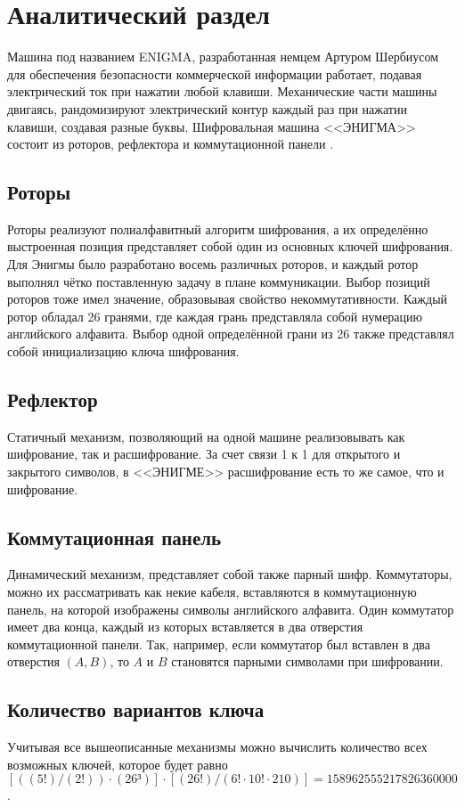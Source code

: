 \chapter{Аналитический раздел}

Машина под названием ENIGMA, разработанная немцем Артуром Шербиусом для обеспечения безопасности коммерческой информации работает, подавая электрический ток при нажатии любой клавиши. Механические части машины двигаясь, рандомизируют электрический контур каждый раз при нажатии клавиши, создавая разные буквы. Шифровальная машина <<ЭНИГМА>> состоит из роторов, рефлектора и коммутационной панели \cite{bib2}.

\section{Роторы}

Роторы реализуют полиалфавитный алгоритм шифрования, а их определённо выстроенная позиция представляет собой один из основных ключей шифрования. Для Энигмы было разработано восемь различных роторов, и каждый ротор выполнял чётко поставленную задачу в плане коммуникации. Выбор позиций роторов тоже имел значение, образовывая свойство некоммутативности. Каждый ротор обладал 26 гранями, где каждая грань представляла собой нумерацию английского алфавита. Выбор одной определённой грани из 26 также представлял собой инициализацию ключа шифрования. 

\section{Рефлектор}

Статичный механизм, позволяющий на одной машине реализовывать как шифрование, так и расшифрование. За счет связи 1 к 1 для открытого и закрытого символов, в <<ЭНИГМЕ>> расшифрование есть то же самое, что и шифрование.

\section{Коммутационная панель}

Динамический механизм, представляет собой также парный шифр. Коммутаторы, можно их рассматривать как некие кабеля, вставляются в коммутационную панель, на которой изображены символы английского алфавита. Один коммутатор имеет два конца, каждый из которых вставляется в два отверстия коммутационной панели. Так, например, если коммутатор был вставлен в два отверстия $(A, B)$, то $A$ и $B$ становятся парными символами при шифровании. 

\section{Количество вариантов ключа}

Учитывая все вышеописанные механизмы можно вычислить количество всех возможных ключей, которое будет равно $[((5!) / (2!)) \cdot (26³)] \cdot [(26!) / (6! \cdot 10! \cdot 210)] = 158 962 555 217 826 360 000$.